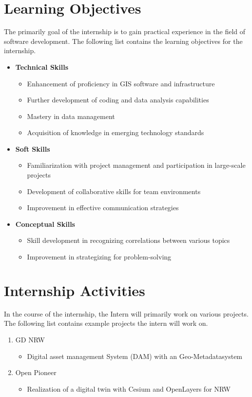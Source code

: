 \documentclass[11pt, titlepage, a4paper]{article}
\begin{document}
\section{Learning Objectives}
The primarily goal of the internship is to gain practical experience in the field of software development. The following list contains the learning objectives for the internship. 
\begin{itemize}
    \item \textbf{Technical Skills}
    \begin{itemize}
        \item Enhancement of proficiency in GIS software and infrastructure
        \item Further development of coding and data analysis capabilities
        \item Mastery in data management
        \item Acquisition of knowledge in emerging technology standards
    \end{itemize}
    \item \textbf{Soft Skills}
    \begin{itemize}
        \item Familiarization with project management and participation in large-scale projects
        \item Development of collaborative skills for team environments
        \item Improvement in effective communication strategies
    \end{itemize}
    \item \textbf{Conceptual Skills}
    \begin{itemize}
        \item Skill development in recognizing correlations between various topics
        \item Improvement in strategizing for problem-solving
    \end{itemize}
    \end{itemize}
    

\section{Internship Activities}
In the course of the internship, the Intern will primarily work on various projects. The following list contains example projects the intern will work on. 

\begin{enumerate}
    \item GD NRW
    \begin{itemize}
        \item Digital asset management System (DAM) with an Geo-Metadatasystem
    \end{itemize}
    \item Open Pioneer
    \begin{itemize}
        \item Realization of a digital twin with Cesium and OpenLayers for NRW 
    \end{itemize}
    \end{enumerate}
\end{document}
